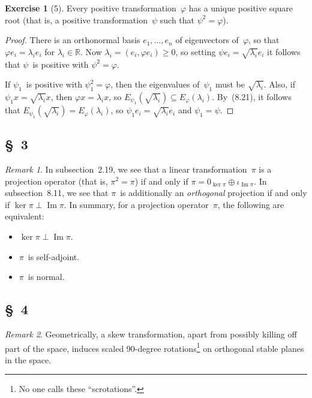 \documentclass[letterpaper,12pt]{article}
\newcommand{\R}{\mathbb{R}}
\newcommand{\orth}{\perp}
\DeclareMathOperator{\im}{Im}
\newcommand{\dsum}{\oplus}
\newcommand{\iprod}[2]{(#1,#2)}
\theoremstyle{definition}
\newtheorem*{exer}{Exercise}
\theoremstyle{remark}
\newtheorem*{rmk}{Remark}
\begin{document}
\begin{exer}[5]
Every positive transformation~\(\varphi\) has a unique positive square root (that is, a positive transformation~\(\psi\) such that \(\psi^2=\varphi\)).
\end{exer}
\begin{proof}
There is an orthonormal basis \(e_1,\ldots,e_n\) of eigenvectors of~\(\varphi\), so that \(\varphi e_i=\lambda_i e_i\) for \(\lambda_i\in\R\). Now \(\lambda_i=\iprod{e_i}{\varphi e_i}\ge 0\), so setting \(\psi e_i=\sqrt{\lambda_i}e_i\) it follows that \(\psi\)~is positive with \(\psi^2=\varphi\).

If \(\psi_1\)~is positive with \(\psi_1^2=\varphi\), then the eigenvalues of~\(\psi_1\) must be \(\sqrt{\lambda_i}\). Also, if \(\psi_1x=\sqrt{\lambda_i}x\), then \(\varphi x=\lambda_i x\), so \(E_{\psi_1}(\sqrt{\lambda_i})\subseteq E_{\varphi}(\lambda_i)\). By~(8.21), it follows that \(E_{\psi_1}(\sqrt{\lambda_i})=E_{\varphi}(\lambda_i)\), so \(\psi_1 e_i=\sqrt{\lambda_i}e_i\) and \(\psi_1=\psi\).
\end{proof}

\subsection*{\S~3}
\begin{rmk}
In subsection~2.19, we see that a linear transformation~\(\pi\) is a projection operator (that is, \(\pi^2=\pi\)) if and only if \(\pi=0_{\ker\pi}\dsum\iota_{\im\pi}\). In subsection~8.11, we see that \(\pi\)~is additionally an \emph{orthogonal} projection if and only if \(\ker\pi\orth\im\pi\). In summary, for a projection operator~\(\pi\), the following are equivalent:
\begin{itemize}[itemsep=0pt]
\item \(\ker\pi\orth\im\pi\).
\item \(\pi\)~is self-adjoint.
\item \(\pi\)~is normal.
\end{itemize}
\end{rmk}

\subsection*{\S~4}
\begin{rmk}
Geometrically, a skew transformation, apart from possibly killing off part of the space, induces scaled 90-degree rotations\footnote{No one calls these ``scrotations''.} on orthogonal stable planes in the space.
\end{rmk}
\end{document}
